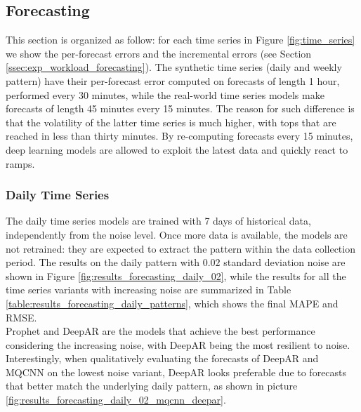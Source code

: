 \documentclass[a4paper, 12pt]{article} %
\begin{document}
	\subsection{Forecasting} \label{ssec:results_forecasting}
	This section is organized as follow: for each time series in Figure \ref{fig:time_series} we show the per-forecast errors and the incremental errors (see Section \ref{ssec:exp_workload_forecasting}). 
	The synthetic time series (daily and weekly pattern) have their per-forecast error computed on forecasts of length 1 hour, performed every 30 minutes, while the real-world time series models make forecasts of length 45 minutes every 15 minutes. The reason for such difference is that the volatility of the latter time series is much higher, with tops that are reached in less than thirty minutes. By re-computing forecasts every 15 minutes, deep learning models are allowed to exploit the latest data and quickly react to ramps.
	
	\subsubsection{Daily Time Series} \label{sssec:results_forecasting_daily}
	The daily time series models are trained with 7 days of historical data, independently from the noise level. Once more data is available, the models are not retrained: they are expected to extract the pattern within the data collection period.  The results on the daily pattern with $0.02$ standard deviation noise are shown in Figure \ref{fig:results_forecasting_daily_02}, while the results for all the time series variants with increasing noise are summarized in Table \ref{table:results_forecasting_daily_patterns}, which shows the final MAPE and RMSE.\\ 
	Prophet and DeepAR are the models that achieve the best performance considering the increasing noise, with DeepAR being the most resilient to noise. Interestingly, when qualitatively evaluating the forecasts of DeepAR and MQCNN on the lowest noise variant, DeepAR looks preferable due to forecasts that better match the underlying daily pattern, as shown in picture \ref{fig:results_forecasting_daily_02_mqcnn_deepar}. 
	
\end{document}
